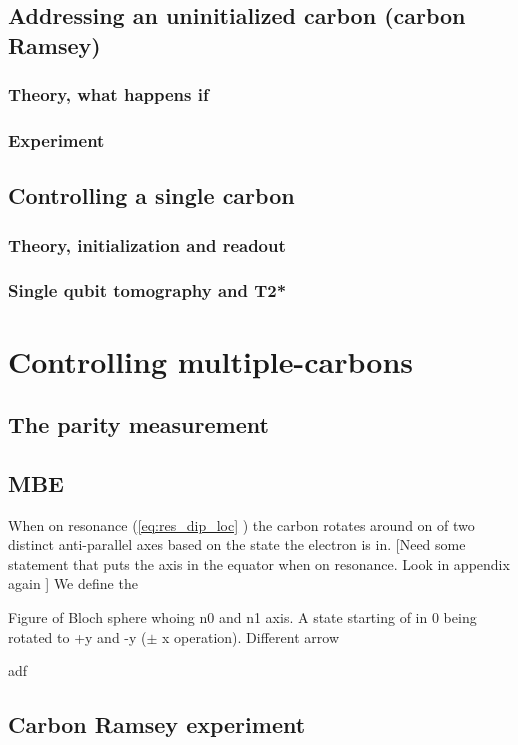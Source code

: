 \subsection{Addressing an uninitialized carbon (carbon Ramsey) }
\subsubsection{Theory, what happens if }
\subsubsection{Experiment}

\subsection{Controlling a single carbon}
\subsubsection{Theory, initialization and readout}
\subsubsection{Single qubit tomography and T2*}

\section{Controlling multiple-carbons}
\subsection{The parity measurement}
\subsection{MBE}


When on resonance (\cref{eq:res_dip_loc} ) the carbon rotates around on of two distinct anti-parallel axes based on the state the electron is in.
[Need some statement that puts the axis in the equator when on resonance. Look in appendix again ]
We define the

Figure of Bloch sphere whoing n0 and n1 axis.
A state starting of in 0 being rotated to +y and -y ($\pm $ x operation).
Different arrow


adf

\subsection{Carbon Ramsey experiment }




